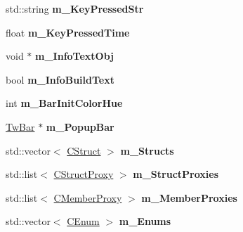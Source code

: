 \begin{DoxyCompactItemize}
\item 
\hypertarget{struct_c_tw_mgr_a2cef6c6824570fd8e8ed7df4133a024d}{std\+::string {\bfseries m\+\_\+\+Key\+Pressed\+Str}}\label{struct_c_tw_mgr_a2cef6c6824570fd8e8ed7df4133a024d}

\item 
\hypertarget{struct_c_tw_mgr_adba0f860e5e0a1fe2385880364f2ff9f}{float {\bfseries m\+\_\+\+Key\+Pressed\+Time}}\label{struct_c_tw_mgr_adba0f860e5e0a1fe2385880364f2ff9f}

\item 
\hypertarget{struct_c_tw_mgr_a4524e41e2dd987b6a4e1a02178c40253}{void $\ast$ {\bfseries m\+\_\+\+Info\+Text\+Obj}}\label{struct_c_tw_mgr_a4524e41e2dd987b6a4e1a02178c40253}

\item 
\hypertarget{struct_c_tw_mgr_a7ae16f16b4a1190738b7523b91c74d33}{bool {\bfseries m\+\_\+\+Info\+Build\+Text}}\label{struct_c_tw_mgr_a7ae16f16b4a1190738b7523b91c74d33}

\item 
\hypertarget{struct_c_tw_mgr_acda47d517766b483de75864acb31b13c}{int {\bfseries m\+\_\+\+Bar\+Init\+Color\+Hue}}\label{struct_c_tw_mgr_acda47d517766b483de75864acb31b13c}

\item 
\hypertarget{struct_c_tw_mgr_ac1e8856d8cab2578894caf4963451bc6}{\hyperlink{struct_c_tw_bar}{Tw\+Bar} $\ast$ {\bfseries m\+\_\+\+Popup\+Bar}}\label{struct_c_tw_mgr_ac1e8856d8cab2578894caf4963451bc6}

\item 
\hypertarget{struct_c_tw_mgr_a4ab4c9d5e5b9234478ef649c53eecf86}{std\+::vector$<$ \hyperlink{struct_c_tw_mgr_1_1_c_struct}{C\+Struct} $>$ {\bfseries m\+\_\+\+Structs}}\label{struct_c_tw_mgr_a4ab4c9d5e5b9234478ef649c53eecf86}

\item 
\hypertarget{struct_c_tw_mgr_ab383d34f8e747299ad0de29651845666}{std\+::list$<$ \hyperlink{struct_c_tw_mgr_1_1_c_struct_proxy}{C\+Struct\+Proxy} $>$ {\bfseries m\+\_\+\+Struct\+Proxies}}\label{struct_c_tw_mgr_ab383d34f8e747299ad0de29651845666}

\item 
\hypertarget{struct_c_tw_mgr_a67dd5172d4967bf4a6d679bc4cd834f7}{std\+::list$<$ \hyperlink{struct_c_tw_mgr_1_1_c_member_proxy}{C\+Member\+Proxy} $>$ {\bfseries m\+\_\+\+Member\+Proxies}}\label{struct_c_tw_mgr_a67dd5172d4967bf4a6d679bc4cd834f7}

\item 
\hypertarget{struct_c_tw_mgr_a7dd7696efe8f4de70ec8141cf5deed15}{std\+::vector$<$ \hyperlink{struct_c_tw_mgr_1_1_c_enum}{C\+Enum} $>$ {\bfseries m\+\_\+\+Enums}}\label{struct_c_tw_mgr_a7dd7696efe8f4de70ec8141cf5deed15}


\end{DoxyCompactItemize}
